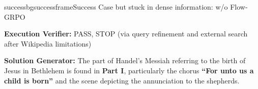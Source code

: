 \begin{small}
\begin{center}
\begin{casebox}{successbg}{successframe}{Success Case but stuck in dense information: \model w/o Flow-GRPO}
    \vspace{1em}

    \textbf{Execution Verifier:} \textcolor{successframe}{PASS, STOP (via query refinement and external search after Wikipedia limitations)}

    \vspace{1em}

    \textbf{Solution Generator: } \textcolor{successframe}{The part of Handel's Messiah referring to the birth of Jesus in Bethlehem is found in \textbf{Part I}, particularly the chorus \textbf{``For unto us a child is born''} and the scene depicting the annunciation to the shepherds.}

\end{casebox}

\end{center}
\end{small}
